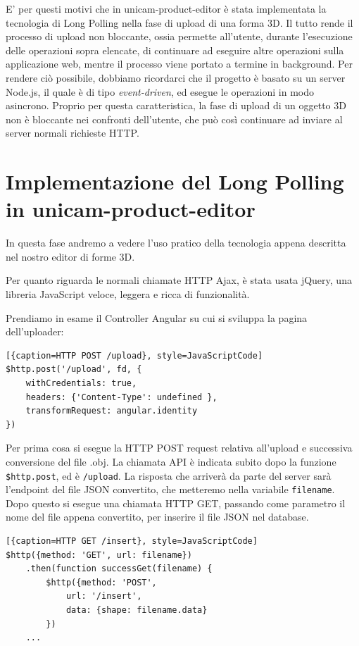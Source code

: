 E' per questi motivi che in unicam-product-editor è stata implementata la tecnologia di Long Polling nella fase di upload di una forma 3D.
Il tutto rende il processo di upload non bloccante, ossia permette all'utente, durante l'esecuzione delle operazioni sopra elencate, di continuare ad eseguire altre operazioni sulla applicazione web, mentre il processo viene portato a termine in background.
Per rendere ciò possibile, dobbiamo ricordarci che il progetto è basato su un server Node.js, il quale è di tipo \emph{event-driven}, ed esegue le operazioni in modo asincrono. Proprio per questa caratteristica, la fase di upload di un oggetto 3D non è bloccante nei confronti dell'utente, che può così continuare ad inviare al server normali richieste HTTP.

\section{Implementazione del Long Polling in unicam-product-editor}
In questa fase andremo a vedere l'uso pratico della tecnologia appena descritta nel nostro editor di forme 3D.

Per quanto riguarda le normali chiamate HTTP Ajax, è stata usata jQuery, una libreria JavaScript veloce, leggera e ricca di funzionalità.

Prendiamo in esame il Controller Angular su cui si sviluppa la pagina dell'uploader:

\begin{lstlisting}[{caption=HTTP POST /upload}, style=JavaScriptCode]
$http.post('/upload', fd, {
	withCredentials: true,
	headers: {'Content-Type': undefined },
	transformRequest: angular.identity
})
\end{lstlisting}
Per prima cosa si esegue la HTTP POST request relativa all'upload e successiva conversione del file .obj. La chiamata API è indicata subito dopo la funzione \texttt{\$http.post}, ed è \texttt{/upload}.
La risposta che arriverà da parte del server sarà l'endpoint del file JSON convertito, che metteremo nella variabile \texttt{filename}.
Dopo questo si esegue una chiamata HTTP GET, passando come parametro il nome del file appena convertito, per inserire il file JSON nel database.  

\begin{lstlisting}[{caption=HTTP GET /insert}, style=JavaScriptCode]
$http({method: 'GET', url: filename})
	.then(function successGet(filename) {
		$http({method: 'POST',
			url: '/insert',
			data: {shape: filename.data}
		})
	...
\end{lstlisting}

